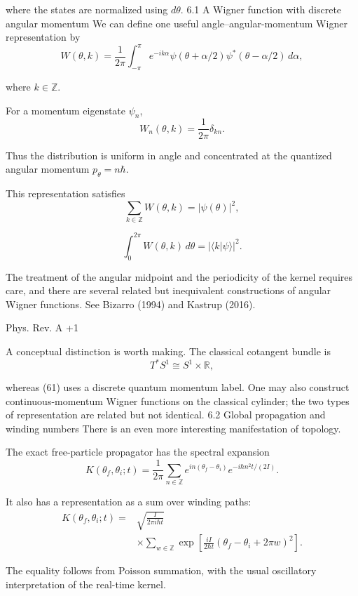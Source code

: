 where the states are normalized using \(d\theta\).
6.1 A Wigner function with discrete angular momentum
We can define one useful angle–angular-momentum Wigner representation by
\[
\boxed{
W(\theta,k)=
\frac1{2\pi}
\int_{-\pi}^{\pi}
e^{-ik\alpha}
\psi(\theta+\alpha/2)
\psi^*(\theta-\alpha/2)\,d\alpha,
}
\tag{61}
\]

where \(k\in\mathbb Z\).

For a momentum eigenstate \(\psi_n\),
\[
W_n(\theta,k)
=
\frac1{2\pi}\delta_{kn}.
\tag{62}
\]

Thus the distribution is uniform in angle and concentrated at the quantized angular momentum \(p_\theta=n\hbar\).

This representation satisfies
\[
\sum_{k\in\mathbb Z}W(\theta,k)
=
|\psi(\theta)|^2,
\tag{63}
\]

\[
\int_0^{2\pi}W(\theta,k)\,d\theta
=
|\langle k|\psi\rangle|^2.
\tag{64}
\]

The treatment of the angular midpoint and the periodicity of the kernel requires care, and there are several related but inequivalent constructions of angular Wigner functions. See Bizarro (1994) and Kastrup (2016). 

Phys. Rev. A
+1




A conceptual distinction is worth making. The classical cotangent bundle is
\[
T^*S^1\cong S^1\times\mathbb R,
\]

whereas (61) uses a discrete quantum momentum label. One may also construct continuous-momentum Wigner functions on the classical cylinder; the two types of representation are related but not identical.
6.2 Global propagation and winding numbers
There is an even more interesting manifestation of topology.

The exact free-particle propagator has the spectral expansion
\[
K(\theta_f,\theta_i;t)
=
\frac1{2\pi}
\sum_{n\in\mathbb Z}
e^{in(\theta_f-\theta_i)}
e^{-i\hbar n^2t/(2I)}.
\tag{65}
\]

It also has a representation as a sum over winding paths:
\[
\boxed{
\begin{aligned}
K(\theta_f,\theta_i;t)
={}&
\sqrt{\frac{I}{2\pi i\hbar t}}\\
&\times\sum_{w\in\mathbb Z}
\exp\left[
\frac{iI}{2\hbar t}
(\theta_f-\theta_i+2\pi w)^2
\right].
\end{aligned}
}
\tag{66}
\]

The equality follows from Poisson summation, with the usual oscillatory interpretation of the real-time kernel.

